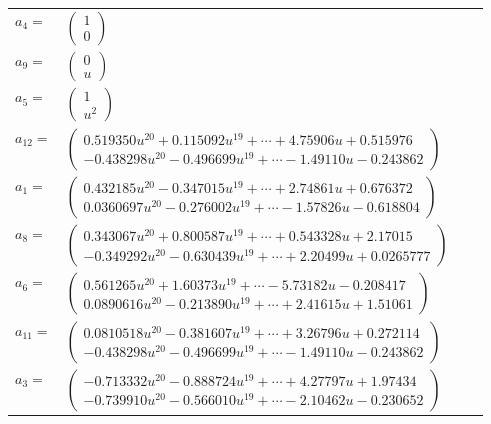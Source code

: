 \documentclass[1p]{elsarticle_modified}
\theoremstyle{definition}
\begin{document}
\begin{tabular}{m{7pt} m{180pt} m{7pt} m{180pt} }
\flushright $a_{4}=$&$\begin{pmatrix}1\\0\end{pmatrix}$ \\
\flushright $a_{9}=$&$\begin{pmatrix}0\\u\end{pmatrix}$ \\
\flushright $a_{5}=$&$\begin{pmatrix}1\\u^2\end{pmatrix}$ \\
\flushright $a_{12}=$&$\begin{pmatrix}0.519350 u^{20}+0.115092 u^{19}+\cdots+4.75906 u+0.515976\\-0.438298 u^{20}-0.496699 u^{19}+\cdots-1.49110 u-0.243862\end{pmatrix}$ \\
\flushright $a_{1}=$&$\begin{pmatrix}0.432185 u^{20}-0.347015 u^{19}+\cdots+2.74861 u+0.676372\\0.0360697 u^{20}-0.276002 u^{19}+\cdots-1.57826 u-0.618804\end{pmatrix}$ \\
\flushright $a_{8}=$&$\begin{pmatrix}0.343067 u^{20}+0.800587 u^{19}+\cdots+0.543328 u+2.17015\\-0.349292 u^{20}-0.630439 u^{19}+\cdots+2.20499 u+0.0265777\end{pmatrix}$ \\
\flushright $a_{6}=$&$\begin{pmatrix}0.561265 u^{20}+1.60373 u^{19}+\cdots-5.73182 u-0.208417\\0.0890616 u^{20}-0.213890 u^{19}+\cdots+2.41615 u+1.51061\end{pmatrix}$ \\
\flushright $a_{11}=$&$\begin{pmatrix}0.0810518 u^{20}-0.381607 u^{19}+\cdots+3.26796 u+0.272114\\-0.438298 u^{20}-0.496699 u^{19}+\cdots-1.49110 u-0.243862\end{pmatrix}$ \\
\flushright $a_{3}=$&$\begin{pmatrix}-0.713332 u^{20}-0.888724 u^{19}+\cdots+4.27797 u+1.97434\\-0.739910 u^{20}-0.566010 u^{19}+\cdots-2.10462 u-0.230652\end{pmatrix}$ \\

\end{tabular}
\end{document}

